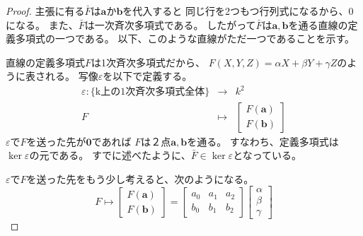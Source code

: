 \documentclass[a4paper]{jsarticle}
\begin{document}
    \begin{proof}
        主張に有る$\bar{F}$は$\mathbf{a}$か$\mathbf{b}$を代入すると
        同じ行を2つもつ行列式になるから、0になる。
        また、$\bar{F}$は一次斉次多項式である。
        したがって$\bar{F}$は$\mathbf{a}, \mathbf{b}$を通る直線の定義多項式の一つである。
        以下、このような直線がただ一つであることを示す。

        直線の定義多項式$F$は1次斉次多項式だから、
        $F(X, Y, Z)=\alpha X + \beta Y + \gamma Z$のように表される。
        写像$\varepsilon$を以下で定義する。
        \begin{eqnarray*}
            \varepsilon : \{ \mbox{k上の1次斉次多項式全体} \} &\to& k^2 \\
            F &\mapsto& 
                    \left[
                      \begin{array}{c}
                          F(\mathbf{a})\\
                          F(\mathbf{b})
                      \end{array}
                    \right]
        \end{eqnarray*}
        $\varepsilon$で$F$を送った先が$\mathbf{0}$であれば
        $F$は２点$\mathbf{a}, \mathbf{b}$を通る。
        すなわち、定義多項式は$\ker \varepsilon$の元である。
        すでに述べたように、$\bar{F} \in \ker \varepsilon$となっている。

        $\varepsilon$で$F$を送った先をもう少し考えると、次のようになる。
        \[
            F \mapsto 
                    \left[
                      \begin{array}{c}
                          F(\mathbf{a}) \\
                          F(\mathbf{b})
                      \end{array}
                    \right]
                    =
                    \left[
                      \begin{array}{ccc}
                          a_0 & a_1 & a_2 \\
                          b_0 & b_1 & b_2
                      \end{array}
                    \right]
                    \left[
                      \begin{array}{c}
                          \alpha \\ \beta \\ \gamma
                      \end{array}
                    \right]
        \]
        

\end{proof}
\end{document}
